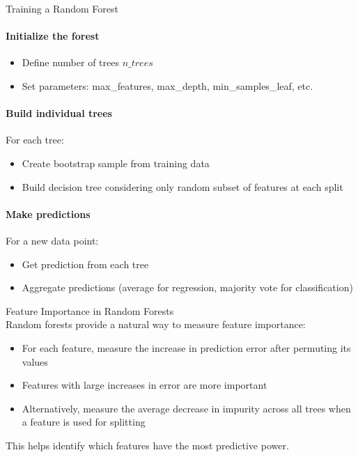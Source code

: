 \begin{KR}{Training a Random Forest}
\paragraph{Initialize the forest}
\begin{itemize}
    \item Define number of trees $n\_trees$
    \item Set parameters: max\_features, max\_depth, min\_samples\_leaf, etc.
\end{itemize}

\paragraph{Build individual trees}
For each tree:
\begin{itemize}
    \item Create bootstrap sample from training data
    \item Build decision tree considering only random subset of features at each split
\end{itemize}

\paragraph{Make predictions}
For a new data point:
\begin{itemize}
    \item Get prediction from each tree
    \item Aggregate predictions (average for regression, majority vote for classification)
\end{itemize}
\end{KR}

\begin{concept}{Feature Importance in Random Forests}\\
Random forests provide a natural way to measure feature importance:
\begin{itemize}
    \item For each feature, measure the increase in prediction error after permuting its values
    \item Features with large increases in error are more important
    \item Alternatively, measure the average decrease in impurity across all trees when a feature is used for splitting
\end{itemize}
This helps identify which features have the most predictive power.
\end{concept}

